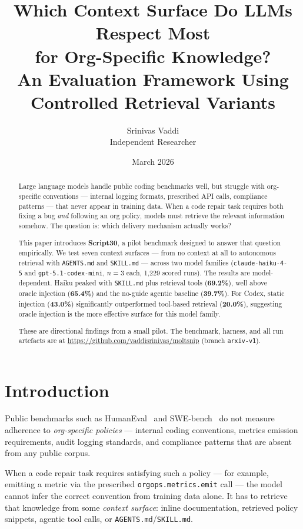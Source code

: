 \documentclass[10pt,a4paper,twocolumn]{article}
\title{Which Context Surface Do LLMs Respect Most\\for Org-Specific Knowledge?\\[0.5em]
\large An Evaluation Framework Using Controlled Retrieval Variants}
\author{Srinivas Vaddi\\Independent Researcher}
\date{March 2026}
\begin{document}
\maketitle

\begin{abstract}
Large language models handle public coding benchmarks well, but struggle
with org-specific conventions --- internal logging formats, prescribed API
calls, compliance patterns --- that never appear in training data.
When a code repair task requires both fixing a bug \emph{and} following an
org policy, models must retrieve the relevant information somehow.
The question is: which delivery mechanism actually works?

This paper introduces \textbf{Script30}, a pilot benchmark designed to
answer that question empirically.
We test seven context surfaces --- from no context at all to autonomous
retrieval with \texttt{AGENTS.md} and \texttt{SKILL.md} --- across two
model families (\texttt{claude-haiku-4-5} and \texttt{gpt-5.1-codex-mini},
$n{=}3$ each, 1,229 scored runs).
The results are model-dependent.
Haiku peaked with \texttt{SKILL.md} plus retrieval tools (\textbf{69.2\%}),
well above oracle injection (\textbf{65.4\%}) and the no-guide agentic
baseline (\textbf{39.7\%}).
For Codex, static injection (\textbf{43.0\%}) significantly outperformed
tool-based retrieval (\textbf{20.0\%}), suggesting oracle injection is the
more effective surface for this model family.

These are directional findings from a small pilot.
The benchmark, harness, and all run artefacts are at
\url{https://github.com/vaddisrinivas/moltsnip} (branch \texttt{arxiv-v1}).
\end{abstract}

\section{Introduction}
\label{sec:introduction}

Public benchmarks such as HumanEval~\citep{chen2021evaluating} and
SWE-bench~\citep{jimenez2024swebench} do not measure adherence to
\emph{org-specific policies} --- internal coding conventions, metrics
emission requirements, audit logging standards, and compliance patterns
that are absent from any public corpus.

When a code repair task requires satisfying such a policy --- for example,
emitting a metric via the prescribed \texttt{orgops.metrics.emit} call ---
the model cannot infer the correct convention from training data alone.
It has to retrieve that knowledge from some \emph{context surface}: inline
documentation, retrieved policy snippets, agentic tool calls, or
\texttt{AGENTS.md}/\texttt{SKILL.md}.
\end{document}
